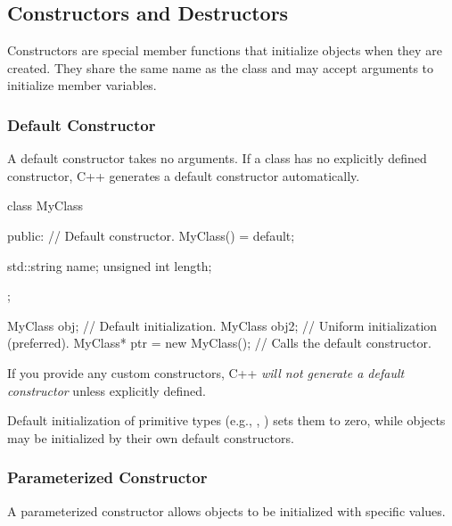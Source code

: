 \subsection{Constructors and Destructors}

Constructors are special member functions that initialize objects when they are created. They share the same name as the class and may accept arguments to initialize member variables.

\subsubsection{Default Constructor}

A default constructor takes no arguments. If a class has no explicitly defined constructor, C++ generates a default constructor automatically.

\begin{codeblock}[language=C++]
class MyClass {
public:
    // Default constructor.
    MyClass() = default;

    std::string name;
    unsigned int length;
};

MyClass obj;    // Default initialization.
MyClass obj2{}; // Uniform initialization (preferred).
MyClass* ptr = new MyClass(); // Calls the default constructor.
\end{codeblock}

\begin{observationblock}
If you provide any custom constructors, C++ \textit{will not generate a default constructor} unless explicitly defined.

Default initialization of primitive types (e.g., , ) sets them to zero, while objects may be initialized by their own default constructors.
\end{observationblock}

\vspace{-0.5em}

\subsubsection{Parameterized Constructor}

\vspace{-0.3em}

A parameterized constructor allows objects to be initialized with specific values.

\vspace{-0.3em}

